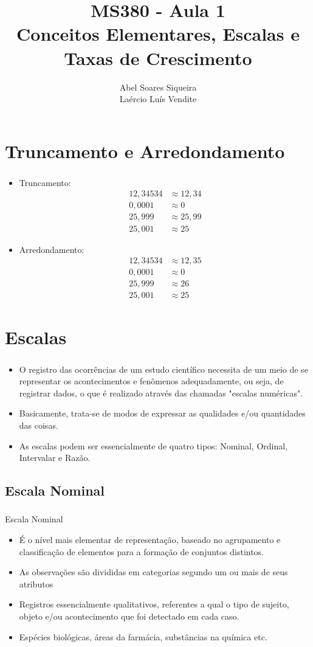 \documentclass[10 pt]{beamer}
\title{ MS380 - Aula 1 \\
Conceitos Elementares, Escalas e Taxas de Crescimento}
\author{Abel Soares Siqueira \\
Laércio Luís Vendite}
\date{}
\newcommand{\makesection}[1]{\section[#1]{#1}}
\newcommand{\makesubsection}[1]{\subsection[#1]{#1}}
\newcommand{\myframe}[1]{
\begin{frame}
 \frametitle{\insertsection \qquad {\small \insertsubsection}}
#1
\end{frame}}
\begin{document}
\begin{frame}
 \titlepage
\end{frame}

\makesection{Truncamento e Arredondamento}

\myframe {
  \begin{itemize}
    \item<1-> Truncamento: \\
      \begin{align*}
        12,34534 & \approx 12,34 \\
        0,0001 & \approx 0 \\
        25,999 & \approx 25,99 \\
        25,001 & \approx 25
      \end{align*}
    \item<2-> Arredondamento: \\
      \begin{align*}
        12,34534 & \approx 12,35 \\
        0,0001 & \approx 0 \\
        25,999 & \approx 26 \\
        25,001 & \approx 25
      \end{align*}
  \end{itemize}
}

\makesection{Escalas}

\myframe {
\begin{itemize}
  \item O registro das ocorrências de um estudo científico necessita de um meio 
  de se representar os acontecimentos e fenômenos adequadamente, ou seja, 
  de registrar dados, o que é realizado através das chamadas "escalas numéricas". 
  \item Basicamente, trata-se de modos de expressar as qualidades e/ou quantidades das coisas.
  \item As escalas podem ser  essencialmente de quatro tipos: Nominal, Ordinal, Intervalar e Razão.
  \end{itemize}
}

\makesubsection{Escala Nominal}

\myframe {
  Escala Nominal
  \begin{itemize}
    \item É o nível mais elementar de representação, baseado no 
      agrupamento e classificação de elementos para a formação de conjuntos distintos.
    \item As observações são divididas em categorias segundo um ou mais de seus atributos
    \item Registros essencialmente qualitativos, referentes a qual o 
      tipo de sujeito, objeto e/ou acontecimento que foi detectado em cada caso. 
    \item Espécies biológicas, áreas da farmácia, substâncias na química etc.
  \end{itemize}
}
\end{document}
